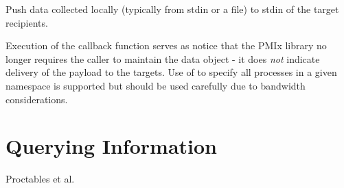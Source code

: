 Push data collected locally (typically from stdin or a file) to stdin of the target recipients.

\adviceuserstart
Execution of the  callback function serves as notice that the \ac{PMIx} library no longer requires the caller to maintain the  data object - it does \textit{not} indicate delivery of the payload to the targets. Use of  to specify all processes in a given namespace is supported but should be used carefully due to bandwidth considerations.
\adviceuserend





\section{Querying Information}

Proctables et al.



